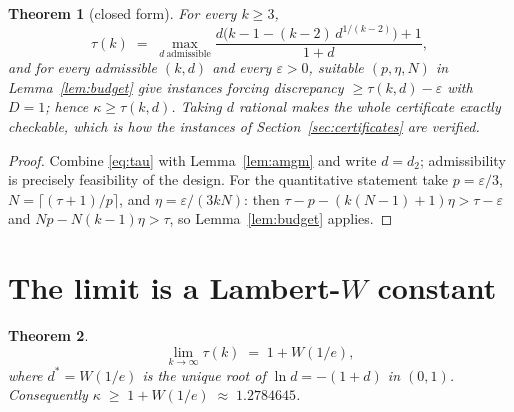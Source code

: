 \documentclass[11pt]{article}
\newtheorem{theorem}{Theorem}
\theoremstyle{definition}
\newcommand{\eps}{\varepsilon}
\newcommand{\W}{W}
\begin{document}
\begin{theorem}[closed form]\label{thm:tau}
For every $k\ge3$,
\[
 \tau(k)\;=\;\max_{d\ \mathrm{admissible}}
 \frac{d\bigl(k-1-(k-2)\,d^{1/(k-2)}\bigr)+1}{1+d},
\]
and for every admissible $(k,d)$ and every $\eps>0$, suitable
$(p,\eta,N)$ in Lemma~\ref{lem:budget} give instances forcing discrepancy
$\ge\tau(k,d)-\eps$ with $D=1$; hence $\kappa\ge\tau(k,d)$.  Taking $d$
rational makes the whole certificate exactly checkable, which is how the
instances of Section~\ref{sec:certificates} are verified.
\end{theorem}

\begin{proof}
Combine \eqref{eq:tau} with Lemma~\ref{lem:amgm} and write $d=d_2$;
admissibility is precisely feasibility of the design.  For the
quantitative statement take $p=\eps/3$, $N=\lceil(\tau+1)/p\rceil$, and
$\eta=\eps/(3kN)$: then $\tau-p-(k(N-1)+1)\eta>\tau-\eps$ and
$Np-N(k-1)\eta>\tau$, so Lemma~\ref{lem:budget} applies.
\end{proof}

\section{The limit is a Lambert-$W$ constant}\label{sec:limit}

\begin{theorem}\label{thm:limit}
\[
 \lim_{k\to\infty}\tau(k)\;=\;1+\W(1/e),
\]
where $d^*=\W(1/e)$ is the unique root of $\ln d=-(1+d)$ in $(0,1)$.
Consequently $\kappa\;\ge\;1+\W(1/e)\;\approx\;1.2784645$.
\end{theorem}
\end{document}
